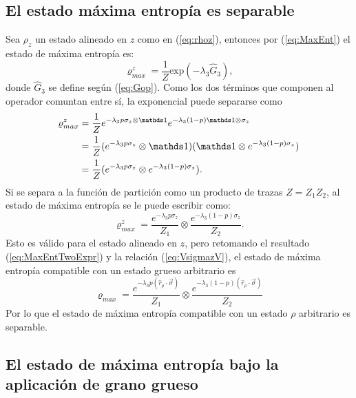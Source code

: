 \subsection{El estado máxima entropía es separable}

Sea $\rho_{z}$ un estado alineado en $z$ como en (\ref{eq:rhoz}), entonces por (\ref{eq:MaxEnt}) el estado de máxima entropía es:
\begin{equation}\label{eq:MaxEntUgly}
\varrho_{max}^{z}=\frac{1}{Z}\text{exp}(-\lambda_{3}\hat{G}_{3}),
\end{equation}
donde $\hat{G}_{3}$ se define según (\ref{eq:Gop}). Como los dos términos que componen al operador comuntan entre sí, la exponencial puede separarse como
\begin{align*}
\varrho_{max}^{z}&=\frac{1}{Z}e^{-\lambda_{3}p\sigma_{z}\otimes\Id}e^{-\lambda_{3}(1-p)\Id\otimes\sigma_{z}}\\
&=\frac{1}{Z}(e^{-\lambda_{3}p\sigma_{z}}\otimes\Id)( \Id\otimes e^{-\lambda_{3}(1-p)\sigma_{z}})\\
&=\frac{1}{Z}(e^{-\lambda_{3}p\sigma_{z}}\otimes e^{-\lambda_{3}(1-p)\sigma_{z}}).\\
\end{align*}
Si se separa a la función de partición como un producto de trazas $Z=Z_{1}Z_{2}$, al estado de máxima entropía se le puede escribir como:
\begin{equation}\label{eq:MaxEntZ}
\varrho_{max}^{z}=\frac{e^{-\lambda_{3}p\sigma_{z}}}{Z_{1}} \otimes \frac{e^{-\lambda_{3}(1-p)\sigma_{z}}}{Z_{2}}.
\end{equation}
Esto es válido para el estado alineado en $z$, pero retomando el resultado (\ref{eq:MaxEntTwoExpr}) y la relación (\ref{eq:VsigmazV}), el estado de máxima entropía compatible con un estado grueso arbitrario es
\begin{equation}\label{eq:MaxEntSeparable}
  \boxed{\varrho_{max}=\frac{e^{-\lambda_{3}p(\hat{r}_{\rho}\cdot\vec{\sigma})}}{Z_{1}} \otimes \frac{e^{-\lambda_{3}(1-p)(\hat{r}_{\rho}\cdot\vec{\sigma})}}{Z_{2}}}
\end{equation}
Por lo que el estado de máxima entropía compatible con un estado $\rho$ arbitrario es separable.

\subsection{El estado de máxima entropía bajo la aplicación de grano grueso}\label{sec:CG(MaxEnt)}

